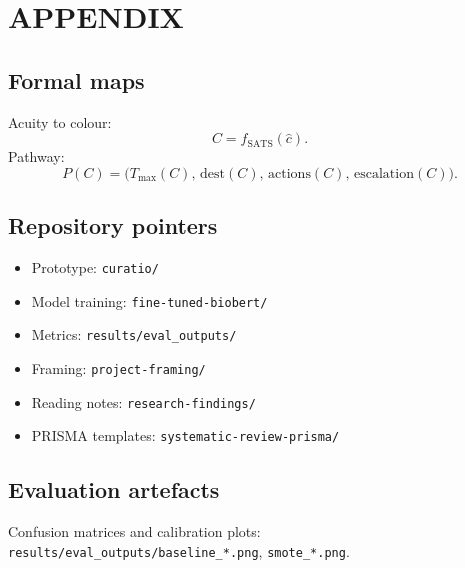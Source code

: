 \chapter{APPENDIX}

\section{Formal maps}

Acuity to colour:
\[
C=f_{\mathrm{SATS}}(\hat{c}).
\]
Pathway:
\[
P(C)=\bigl(T_{\max}(C),\,\mathrm{dest}(C),\,\mathrm{actions}(C),\,\mathrm{escalation}(C)\bigr).
\]

\section{Repository pointers}

\begin{itemize}
  \item Prototype: \texttt{curatio/}
  \item Model training: \texttt{fine-tuned-biobert/}
  \item Metrics: \texttt{results/eval\_outputs/}
  \item Framing: \texttt{project-framing/}
  \item Reading notes: \texttt{research-findings/}
  \item PRISMA templates: \texttt{systematic-review-prisma/}
\end{itemize}

\section{Evaluation artefacts}

Confusion matrices and calibration plots: \texttt{results/eval\_outputs/baseline\_*.png}, \texttt{smote\_*.png}.
